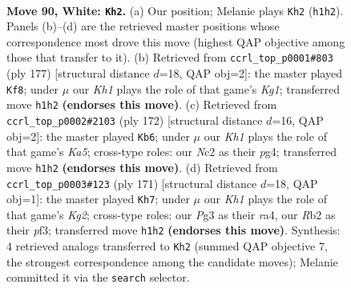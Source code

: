 \documentclass[11pt]{article}
\begin{document}
\clearpage

\begin{figure}[p]\centering
\begin{subfigure}{0.46\textwidth}\centering
\resizebox{\linewidth}{!}{%
\newchessgame
\chessboard[
  setfen={8/3r2p1/5p2/5k1p/7P/6P1/1RN5/7K w - - 4 90},
  showmover=false,
  pgfstyle=straightmove, color=movearrow, markmove={h1-h2}
]}
\caption{}
\end{subfigure}\hfill
\begin{subfigure}{0.46\textwidth}\centering
\resizebox{\linewidth}{!}{%
\newchessgame
\chessboard[
  setfen={3r2k1/5p2/5P1p/4P2P/R4K2/8/8/8 b - - 65 89},
  showmover=false,
  pgfstyle=straightmove, color=movearrow, markmove={g8-f8}
]}
\caption{}
\end{subfigure}
\\[4pt]
\begin{subfigure}{0.46\textwidth}\centering
\resizebox{\linewidth}{!}{%
\newchessgame
\chessboard[
  setfen={4R3/8/2p2k2/K1Pp1p2/3P1Pp1/6r1/8/8 w - - 0 87},
  showmover=false,
  pgfstyle=straightmove, color=movearrow, markmove={a5-b6}
]}
\caption{}
\end{subfigure}\hfill
\begin{subfigure}{0.46\textwidth}\centering
\resizebox{\linewidth}{!}{%
\newchessgame
\chessboard[
  setfen={8/1r4k1/6p1/6Pp/R6P/5P2/6K1/8 b - - 86 86},
  showmover=false,
  pgfstyle=straightmove, color=movearrow, markmove={g7-h7}
]}
\caption{}
\end{subfigure}
\caption{\textbf{Move 90, White: \texttt{Kh2}.} (a) Our position; Melanie plays \texttt{Kh2} (\texttt{h1h2}). Panels (b)--(d) are the retrieved master positions whose correspondence most drove this move (highest QAP objective among those that transfer to it). (b) Retrieved from \texttt{ccrl\_top\_p0001\#803} (ply 177) [structural distance $d$=18, QAP obj=2]: the master played \texttt{Kf8}; under $\mu$ our \emph{Kh1} plays the role of that game's \emph{Kg1}; transferred move \texttt{h1h2} \textbf{(endorses this move)}. (c) Retrieved from \texttt{ccrl\_top\_p0002\#2103} (ply 172) [structural distance $d$=16, QAP obj=2]: the master played \texttt{Kb6}; under $\mu$ our \emph{Kh1} plays the role of that game's \emph{Ka5}; cross-type roles: our \emph{N}c2 as their \emph{p}g4; transferred move \texttt{h1h2} \textbf{(endorses this move)}. (d) Retrieved from \texttt{ccrl\_top\_p0003\#123} (ply 171) [structural distance $d$=18, QAP obj=1]: the master played \texttt{Kh7}; under $\mu$ our \emph{Kh1} plays the role of that game's \emph{Kg2}; cross-type roles: our \emph{P}g3 as their \emph{r}a4, our \emph{R}b2 as their \emph{p}f3; transferred move \texttt{h1h2} \textbf{(endorses this move)}. Synthesis: 4 retrieved analogs transferred to \texttt{Kh2} (summed QAP objective 7, the strongest correspondence among the candidate moves); Melanie committed it via the \texttt{search} selector.}
\label{fig:thought-m178}
\end{figure}
\end{document}
